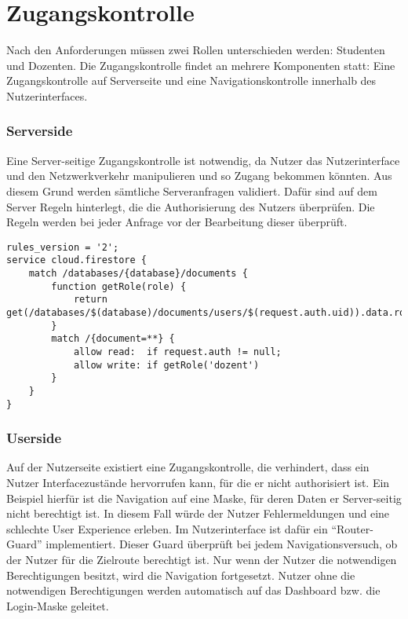 



\section{Zugangskontrolle}
Nach den Anforderungen müssen zwei Rollen unterschieden werden: Studenten und Dozenten.
Die Zugangskontrolle findet an mehrere Komponenten statt: Eine Zugangskontrolle auf Serverseite und eine Navigationskontrolle innerhalb des Nutzerinterfaces.


\subsubsection*{Serverside}
Eine Server-seitige Zugangskontrolle ist notwendig, da Nutzer das Nutzerinterface und den Netzwerkverkehr manipulieren und so Zugang bekommen könnten.
Aus diesem Grund werden sämtliche Serveranfragen validiert.
Dafür sind auf dem Server Regeln hinterlegt, die die Authorisierung des Nutzers überprüfen.
Die Regeln werden bei jeder Anfrage vor der Bearbeitung dieser überprüft.

\begin{lstlisting}[caption={Einfaches Beispiel der Serverside Regeln}, label=lst:firestoreRules]
rules_version = '2';
service cloud.firestore {
    match /databases/{database}/documents {
        function getRole(role) {
            return get(/databases/$(database)/documents/users/$(request.auth.uid)).data.roles[role]
        }
        match /{document=**} {
            allow read:  if request.auth != null;
            allow write: if getRole('dozent')
        }
    }
}\end{lstlisting}


\subsubsection*{Userside}
Auf der Nutzerseite existiert eine Zugangskontrolle, die verhindert, dass ein Nutzer Interfacezustände hervorrufen kann, für die er nicht authorisiert ist.
Ein Beispiel hierfür ist die Navigation auf eine Maske, für deren Daten er Server-seitig nicht berechtigt ist.
In diesem Fall würde der Nutzer Fehlermeldungen und eine schlechte User Experience erleben.
Im Nutzerinterface ist dafür ein \enquote{Router-Guard} implementiert.
Dieser Guard überprüft bei jedem Navigationsversuch, ob der Nutzer für die Zielroute berechtigt ist.
Nur wenn der Nutzer die notwendigen Berechtigungen besitzt, wird die Navigation fortgesetzt.
Nutzer ohne die notwendigen Berechtigungen werden automatisch auf das Dashboard bzw. die Login-Maske geleitet.




